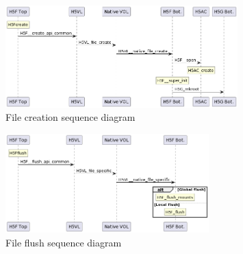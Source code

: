 \begin{figure}
    \centering
    \includegraphics[width=0.80\textwidth]{images/tour2_file_create.png}
    \caption{File creation sequence diagram}
    \label{fig:tour2-file-create}
\end{figure}

\begin{figure}
    \centering
    \includegraphics[width=0.7\textwidth]{images/tour2-file-flush.png}
    \caption{File flush sequence diagram}
    \label{fig:tour2-file-flush}
\end{figure}

